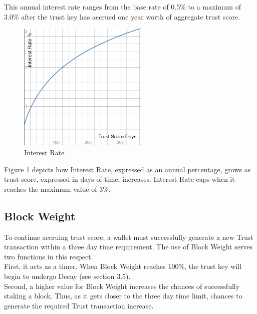 \documentclass[11pt]{article}
\begin{document}
\noindent This annual interest rate ranges from the base rate of 0.5\% to a maximum of 3.0\% after the trust key has accrued one year worth of aggregate trust score. \\

\begin{figure}[h!]
    \centering
    \includegraphics[width=0.55\textwidth]{images/interestRate.png}
    \caption{Interest Rate \label{fig:interestRate}}
\end{figure}

\noindent Figure \ref{fig:interestRate} depicts how Interest Rate, expressed as an annual percentage, grows as trust score, expressed in days of time, increases. Interest Rate caps when it reaches the maximum value of 3\%.\\

\subsection{Block Weight}
To continue accruing trust score, a wallet must successfully generate a new Trust transaction within a three day time requirement. The use of Block Weight serves two functions in this respect.\\

\noindent First, it acts as a timer. When Block Weight reaches 100\%, the trust key will begin to undergo Decay (see section 3.5).\\

\noindent Second, a higher value for Block Weight increases the chances of successfully staking a block. Thus, as it gets closer to the three day time limit, chances to generate the required Trust transaction increase.\\
\end{document}
